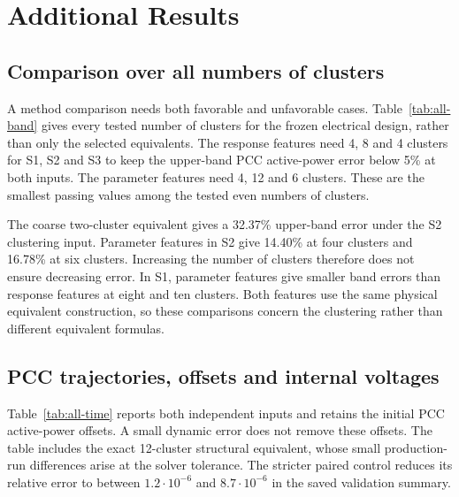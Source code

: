 \section{Additional Results}
\subsection{Comparison over all numbers of clusters}
A method comparison needs both favorable and unfavorable cases.
Table~\ref{tab:all-band} gives every tested number of clusters for the frozen electrical design, rather than only the selected equivalents.
The response features need 4, 8 and 4 clusters for S1, S2 and S3 to keep the upper-band PCC active-power error below 5\% at both inputs.
The parameter features need 4, 12 and 6 clusters.
These are the smallest passing values among the tested even numbers of clusters.

The coarse two-cluster equivalent gives a 32.37\% upper-band error under the S2 clustering input.
Parameter features in S2 give 14.40\% at four clusters and 16.78\% at six clusters.
Increasing the number of clusters therefore does not ensure decreasing error.
In S1, parameter features give smaller band errors than response features at eight and ten clusters.
Both features use the same physical equivalent construction, so these comparisons concern the clustering rather than different equivalent formulas.


\subsection{PCC trajectories, offsets and internal voltages}
Table~\ref{tab:all-time} reports both independent inputs and retains the initial PCC active-power offsets.
A small dynamic error does not remove these offsets.
The table includes the exact 12-cluster structural equivalent, whose small production-run differences arise at the solver tolerance.
The stricter paired control reduces its relative error to between $1.2\cdot10^{-6}$ and $8.7\cdot10^{-6}$ in the saved validation summary.


